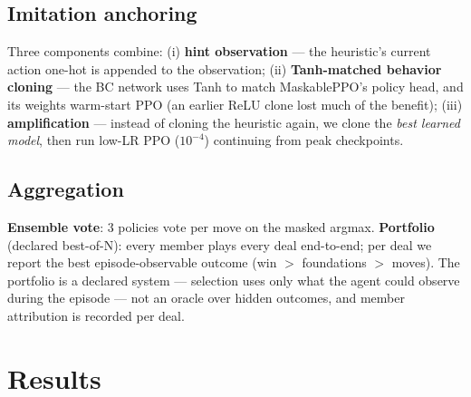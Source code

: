 \documentclass[11pt]{article}
\begin{document}
\subsection{Imitation anchoring}\label{sec:recipe}
Three components combine: (i) \textbf{hint observation} — the
heuristic's current action one-hot is appended to the observation; (ii)
\textbf{Tanh-matched behavior cloning} — the BC network uses Tanh to
match MaskablePPO's policy head, and its weights warm-start PPO (an
earlier ReLU clone lost much of the benefit); (iii)
\textbf{amplification} — instead of cloning the heuristic again, we
clone the \emph{best learned model}, then run low-LR PPO
($10^{-4}$) continuing from peak checkpoints.

\subsection{Aggregation}\label{sec:portfolio}
\textbf{Ensemble vote}: 3 policies vote per move on the masked argmax.
\textbf{Portfolio} (declared best-of-N): every member plays every deal
end-to-end; per deal we report the best episode-observable outcome
(win $>$ foundations $>$ moves). The portfolio is a declared system —
selection uses only what the agent could observe during the episode —
not an oracle over hidden outcomes, and member attribution is recorded
per deal.

\section{Results}\label{sec:results}
\end{document}
